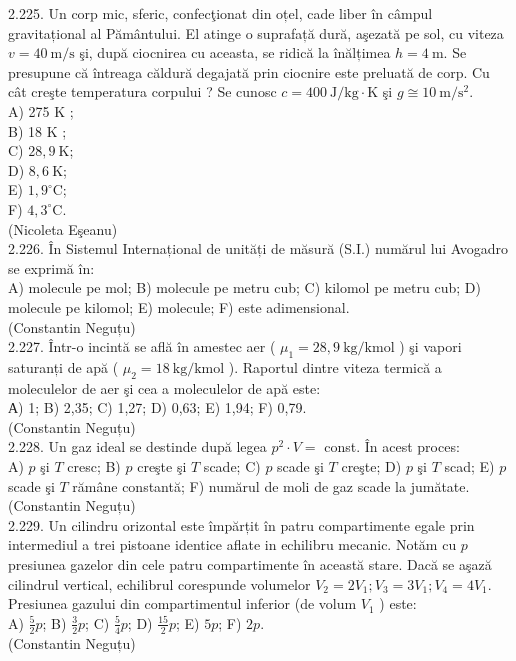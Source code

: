 \documentclass[10pt]{article}
\begin{document}
2.225. Un corp mic, sferic, confecţionat din oțel, cade liber în câmpul gravitațional al Pământului. El atinge o suprafață dură, aşezată pe sol, cu viteza $v=40 \mathrm{~m} / \mathrm{s}$ şi, după ciocnirea cu aceasta, se ridică la înălțimea $h=4 \mathrm{~m}$. Se presupune că întreaga căldură degajată prin ciocnire este preluată de corp. Cu cât creşte temperatura corpului ? Se cunosc $c=400 \mathrm{~J} / \mathrm{kg} \cdot \mathrm{K}$ şi $g \cong 10 \mathrm{~m} / \mathrm{s}^{2}$.\\
A) 275 K ;\\
B) 18 K ;\\
C) $28,9 \mathrm{~K}$;\\
D) $8,6 \mathrm{~K}$;\\
E) $1,9^{\circ} \mathrm{C}$;\\
F) $4,3^{\circ} \mathrm{C}$.\\
(Nicoleta Eşeanu)\\

2.226. În Sistemul Internațional de unități de măsură (S.I.) numărul lui Avogadro se exprimă în:\\ A) molecule pe mol; B) molecule pe metru cub; C) kilomol pe metru cub; D) molecule pe kilomol; E) molecule; F) este adimensional.\\ (Constantin Neguțu)\\

2.227. Într-o incintă se află în amestec aer ( $\mu_{1}=28,9 \mathrm{~kg} / \mathrm{kmol}$ ) şi vapori saturanți de apă ( $\mu_{2}=18 \mathrm{~kg} / \mathrm{kmol}$ ). Raportul dintre viteza termică a moleculelor de aer şi cea a moleculelor de apă este:\\ А) 1; B) 2,35; C) 1,27; D) 0,63; E) 1,94; F) 0,79.\\ (Constantin Neguțu)\\

2.228. Un gaz ideal se destinde după legea $p^{2} \cdot V=$ const. În acest proces:\\ A) $p$ şi $T$ cresc; B) $p$ creşte şi $T$ scade; C) $p$ scade şi $T$ creşte; D) $p$ şi $T$ scad; E) $p$ scade şi $T$ rămâne constantă; F) numărul de moli de gaz scade la jumătate.\\ (Constantin Neguțu)\\

2.229. Un cilindru orizontal este împărțit în patru compartimente egale prin intermediul a trei pistoane identice aflate in echilibru mecanic. Notăm cu $p$ presiunea gazelor din cele patru compartimente în această stare. Dacă se aşază cilindrul vertical, echilibrul corespunde volumelor $V_{2}=2 V_{1} ; V_{3}=3 V_{1} ; V_{4}=4 V_{1}$. Presiunea gazului din compartimentul inferior (de volum $V_{1}$ ) este:\\ A) $\frac{5}{2} p$; B) $\frac{3}{2} p$; C) $\frac{5}{4} p$; D) $\frac{15}{2} p$; E) $5 p$; F) $2 p$.\\ (Constantin Neguțu)\\
\end{document}
